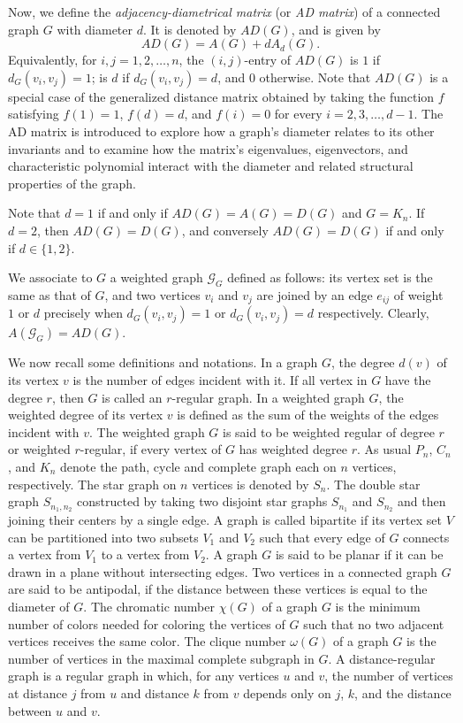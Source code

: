 \documentclass[12pt]{article}
\numberwithin{equation}{section}
\begin{document}
	Now, we define the  \textit{adjacency-diametrical matrix} (or \textit{AD matrix}) of a connected graph $G$ with diameter $d$. It is denoted by $AD(G)$, and is given by $$AD(G)=A(G)+dA_d(G).$$ Equivalently, for $i,j=1,2,\ldots,n$, the $(i,j)$-entry of $AD(G)$ is $1$ if $d_G(v_i,v_j)=1$; is $d$ if $d_G(v_i,v_j)=d$, and $0$ otherwise. Note that $AD(G)$ is a special case of the generalized distance matrix obtained by taking the function $f$ satisfying $f(1)=1$, $f(d)=d$, and $f(i)=0$ for every $i=2,3,\dots,d-1$. 
	The AD matrix is introduced to explore how a graph’s diameter relates to its other invariants and to examine how the matrix’s eigenvalues, eigenvectors, and characteristic polynomial interact with the diameter and related structural properties of the graph. 
	
		Note that $d=1$ if and only if $AD(G)=A(G)=D(G)$ and $G=K_n$. If $d=2$, then $AD(G)=D(G)$, and conversely $AD(G)=D(G)$ if and only if $d \in \{1,2\}$. 
	
	
	We associate to $G$ a weighted graph $\mathcal{G}_G$ defined as follows: its vertex set is the same as that of $G$, and two vertices $v_i$ and $v_j$ are joined by an edge $e_{ij}$ of weight $1$ or $d$ precisely when $d_G(v_i,v_j)=1$ or $d_G(v_i,v_j)=d$ respectively. Clearly, $A(\mathcal{G}_G)=AD(G)$. 	
	
	
	We now recall some definitions and notations. In a graph $G$, the degree $d(v)$ of its vertex $v$  is the number of edges incident with it. If all vertex in $G$ have the degree $r$, then $G$ is called an $r$-regular graph. In a weighted graph $G$, the weighted degree of its vertex $v$ is defined as the sum of the weights of the edges incident with $v$.  The weighted graph $G$ is said to be weighted regular of degree $r$ or weighted $r$-regular, if every vertex of $G$ has weighted degree $r$. As usual $P_n$, $C_n$, and $K_n$ denote the path, cycle and complete graph each on $n$ vertices, respectively. The star graph on $n$ vertices is denoted by $S_{n}$. The double star graph  $S_{n_1,n_2}$ constructed by taking two disjoint star graphs $S_{n_1}$ and $S_{n_2}$ and then joining their centers by a single edge. A graph is called bipartite if its vertex set $V$ can be partitioned into two subsets $V_1$ and $V_2$ such that every edge of $G$ connects a vertex from $V_1$ to a vertex from $V_2$. A graph $G$ is said to be planar if it can be drawn in a plane without intersecting edges. 
	Two vertices in a connected graph $G$ are said to be antipodal, if the distance between these vertices is equal to the diameter of $G$.  The chromatic number $\chi(G)$ of a graph $G$ is  the minimum number of colors needed for coloring the vertices of $G$ such that no two adjacent vertices receives the same color.
The clique number $\omega(G)$ of a graph $G$  is the number of vertices in the maximal complete subgraph in $G$. 	
A distance-regular graph is a regular graph in which, for any vertices $u$ and $v$, the number of vertices at distance $j$ from $u$ and distance $k$ from $v$ depends only on $j$, $k$, and the distance between $u$ and $v$.
\end{document}

